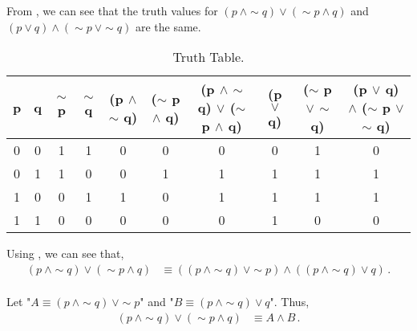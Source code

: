 %
%

\begin{subquestions}


\subquestion

\begin{subsubquestions}
	
\subsubquestion

From , we can see that the truth values for $(p ~\land \sim q) \lor (\sim p \land q)$ and $(p \lor q) \land (\sim p ~\lor \sim q)$ are the same.
\begin{table}[ht]
	\centering
	\begin{tabular}{|c|c|c|c|c|c|c|c|c|c|}
		\hline
		p & q & $\sim$ p & $\sim$ q & (p $\land$ $\sim$ q) & ($\sim$ p $\land$ q) & (p $\land$ $\sim$ q) $\lor$ ($\sim$ p $\land$ q) & (p $\lor$ q) & ($\sim$ p $\lor$ $\sim$ q) & (p $\lor$ q) $\land$ ($\sim$ p $\lor$ $\sim$ q) \\
		\hline
		0 & 0 & 1 & 1 & 0 & 0 & 0 & 0 & 1 & 0  \\
		0 & 1 & 1 & 0 & 0 & 1 & 1 & 1 & 1 & 1  \\ 
		1 & 0 & 0 & 1 & 1 & 0 & 1 & 1 & 1 & 1  \\
		1 & 1 & 0 & 0 & 0 & 0 & 0 & 1 & 0 & 0  \\
		\hline
	\end{tabular}
	\caption{\label{2016:q1:tab:TruthTab1} Truth Table.}
\end{table}


\subsubquestion

Using , we can see that,
\begin{align}
	(p ~\land \sim q) \lor (\sim p \land q) 
	& \equiv ((p ~\land \sim q) ~\lor \sim p) \land ((p ~\land \sim q) \lor q)\,. \label{2016:q1:Bool1}
\end{align}
\\
Let "$A \equiv (p ~\land \sim q) ~\lor \sim p$" and "$B \equiv (p ~\land \sim q) \lor q$". Thus, 
\begin{align}
	(p ~\land \sim q) \lor (\sim p \land q) 
	& \equiv A \land B \,.
\end{align}


\end{subsubquestions}
\end{subquestions}
